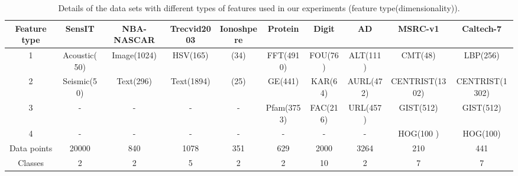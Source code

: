 \documentclass[10pt,journal,compsoc]{IEEEtran}
\begin{document}
\begin{table*}[!t]
    \centering
    \caption{Details of the data sets with different types of features used in our experiments (feature type(dimensionality)).}
    \label{table_DataDetail}
    \scriptsize{
    \begin{tabular}{c||c c c c c c c c c}
    \hline
    Feature type & SensIT       & NBA-NASCAR  & Trecvid2003  & Ionoshpere & Protein    & Digit   & AD     & MSRC-v1        & Caltech-7 \\
    \hline
    1            & Acoustic(50) & Image(1024) & HSV(165)     & (34)       & FFT(4910)  & FOU(76) & ALT(111)  & CMT(48)        & LBP(256)  \\
    2            & Seismic(50)  & Text(296)   & Text(1894)   & (25)       & GE(441)    & KAR(64) & AURL(472)  & CENTRIST(1302) & CENTRIST(1302) \\
    3            & -            & -           & -            &  -         & Pfam(3753) &FAC(216) & URL(457)  & GIST(512)      & GIST(512)  \\
    4            & -            & -           &-             & -          &  -      &-        &-       & HOG(100 )      & HOG(100)  \\
    \hline
    Data points  & 20000        & 840         & 1078         & 351       &  629     & 2000    & 3264   & 210            &  441 \\
    \hline
    Classes      & 2            & 2           & 5            & 2         &  2       & 10      &    2   & 7              &  7  \\
    \hline
\end{tabular}}
\vskip -0.0in
\end{table*}
\end{document}
